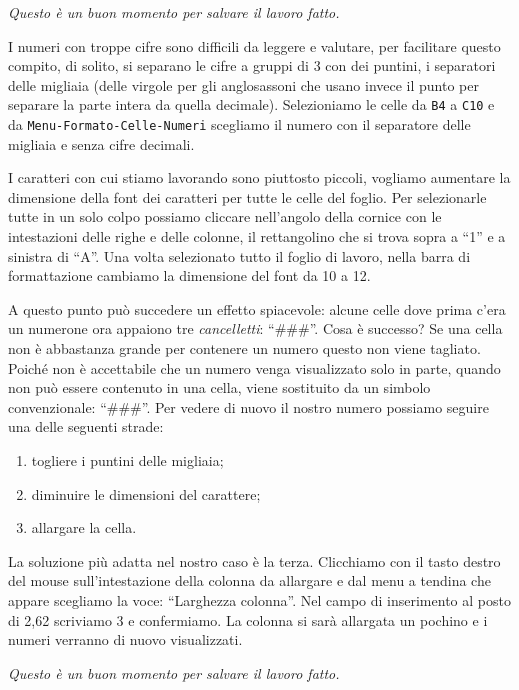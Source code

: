 \emph{Questo è un buon momento per salvare il lavoro fatto.}

I numeri con troppe cifre sono difficili da leggere e valutare,
per facilitare questo compito, di solito, si separano le cifre a gruppi di 3
con dei puntini, i separatori delle migliaia
(delle virgole per gli anglosassoni che
usano invece il punto per separare la parte intera da quella decimale).
Selezioniamo le celle da \texttt{B4} a \texttt{C10} e da \texttt{Menu-Formato-Celle-Numeri}
scegliamo il numero con il separatore delle migliaia e senza cifre decimali.

I caratteri con cui stiamo lavorando sono piuttosto piccoli, vogliamo
aumentare la dimensione della font dei caratteri per tutte le celle del
foglio. Per selezionarle tutte in un solo colpo possiamo cliccare
nell'angolo della cornice con le intestazioni delle righe e delle colonne,
il rettangolino che si trova sopra a ``1'' e a sinistra di ``A''. Una volta
selezionato tutto il foglio di lavoro, nella barra di formattazione cambiamo
la dimensione del font da 10 a 12.

A questo punto può succedere un effetto spiacevole: alcune celle
dove prima c'era un numerone ora appaiono tre \emph{cancelletti}: ``\#\#\#''.
Cosa è successo? Se una cella non è abbastanza grande per contenere un
numero questo non viene tagliato.
Poiché non è accettabile che un numero venga visualizzato solo in parte,
quando non può essere contenuto in una cella, viene sostituito da un simbolo
convenzionale: ``\#\#\#''.
Per vedere di nuovo il nostro numero possiamo seguire una delle seguenti
strade:

\begin{enumerate}
\item {} 
togliere i puntini delle migliaia;

\item {} 
diminuire le dimensioni del carattere;

\item {} 
allargare la cella.

\end{enumerate}

La soluzione più adatta nel nostro caso è la terza.
Clicchiamo con il tasto destro del mouse sull'intestazione della colonna da
allargare e dal menu a tendina che appare scegliamo la voce:
``Larghezza colonna''.
Nel campo di inserimento al posto di 2,62 scriviamo 3 e confermiamo.
La colonna si sarà allargata un pochino e i numeri verranno di nuovo
visualizzati.

\emph{Questo è un buon momento per salvare il lavoro fatto.}


